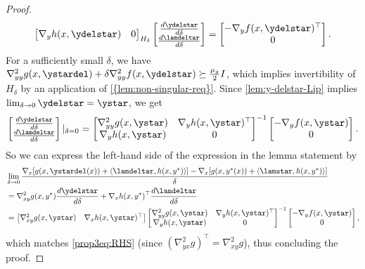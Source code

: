 \begin{proof}
\begin{equation}
{\begin{bmatrix}
\nabla_y h(x,\ydelstar) & 0
\end{bmatrix}}_{H_{\delta}}\begin{bmatrix}\frac{d\ydelstar}{d\delta}\\
\frac{d\lamdeltar}{d\delta}
\end{bmatrix}=\begin{bmatrix}-\nabla_y f(x,\ydelstar)^\top\\
0
\end{bmatrix}.\label{eq:implicit_function}
\end{equation}
For a sufficiently small  $\delta$, we have $\nabla^2_{yy} g(x,\ystardel)+\delta  \nabla^2_{yy} f(x,\ydelstar)\succeq \tfrac{\mu_{g}}{2}I$, which implies  invertibility of $H_{\delta}$ by an application of \cref{{lem:non-singular-req}}. 
Since \cref{lem:y-delstar-Lip} implies  $\lim_{\delta\rightarrow0}\ydelstar=\ystar$, we get 
\[
\begin{bmatrix}\frac{d\ydelstar}{d\delta}\\
\frac{d\lamdeltar}{d\delta}
\end{bmatrix}|_{\delta=0}=\begin{bmatrix}\nabla^2_{yy} g(x,\ystar) & \nabla_y h(x,\ystar)^{\top}\\
\nabla_y h(x,\ystar) & 0
\end{bmatrix}^{-1}\begin{bmatrix}-\nabla_y f(x,\ystar)\\
0
\end{bmatrix}.
\]
So we can express the left-hand side of the expression in the lemma statement by 
\begin{align*}
&\lim_{\delta\rightarrow0}\frac{\nabla_{x}[g(x,\ystardel(x))+\langle\lamdeltar, h(x,y^*)\rangle]-\nabla_{x}[g(x,y^{*}(x))+\langle\lamstar, h(x,y^{*})\rangle]}{\delta}\\
&= \nabla^2_{xy} g(x,y^*) \frac{d\ydelstar}{d\delta} + \nabla_x h(x,y^*)^\top \frac{d\lamdeltar}{d\delta}\\ 
&=\begin{bmatrix}\nabla^2_{xy} g(x,\ystar) & \nabla_x h(x,\ystar)^\top\end{bmatrix}\begin{bmatrix}\nabla^2_{yy} g(x,\ystar) & \nabla_y h(x,\ystar)^{\top}\\
\nabla_y h(x,\ystar) & 0
\end{bmatrix}^{-1}\begin{bmatrix}-\nabla_y f(x,\ystar)\\
0
\end{bmatrix},
\end{align*}
which matches \cref{prop3eq:RHS} (since $(\nabla^2_{yx} g)^\top=\nabla^2_{xy}g$), thus concluding the proof.
\end{proof}

